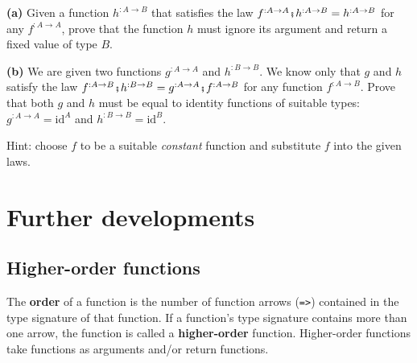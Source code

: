 \textbf{(a)} Given a function $h^{:A\rightarrow B}$ that satisfies
the law $f^{:A\rightarrow A}\bef h^{:A\rightarrow B}=h^{:A\rightarrow B}$
for any $f^{:A\rightarrow A}$, prove that the function $h$ must
ignore its argument and return a fixed value of type $B$.

\textbf{(b)} We are given two functions $g^{:A\rightarrow A}$ and
$h^{:B\rightarrow B}$. We know only that $g$ and $h$ satisfy the
law $f^{:A\rightarrow B}\bef h^{:B\rightarrow B}=g^{:A\rightarrow A}\bef f^{:A\rightarrow B}$
for any function $f^{:A\rightarrow B}$. Prove that both $g$ and
$h$ must be equal to identity functions of suitable types: $g^{:A\rightarrow A}=\text{id}^{A}$
and $h^{:B\rightarrow B}=\text{id}^{B}$.

Hint: choose $f$ to be a suitable \emph{constant} function and substitute
$f$ into the given laws.%
\begin{comment}
Solution:

\textbf{(a)} Choose $f^{:A\rightarrow A}\triangleq\_\rightarrow a$
and compute $x\triangleright f\bef h=h(a)\overset{!}{=}x\triangleright h$.
So, $h(x)$ equals a fixed value $h(a)$. It then follows that the
value $h(a)$ does not depend on $a$ either; so $h(x)$ is a constant
that must be hard-coded in $h$. 

\textbf{(b)} Choose $f^{:A\rightarrow B}\triangleq\_\rightarrow b$
and compute $x\triangleright f\bef h=h(b)\overset{!}{=}x\triangleright g\bef f=x\triangleright g\triangleright f=b$.
It follows that $h(b)=b$ for any $b$, so $h$ is an identity function.
Substitute that into the law and get $f=g\bef f$ for any function
$f$. Substitute the $f\triangleq\text{id}$ into that and derive
$\text{id}=g\bef\text{id}=g$.
\end{comment}


\section{Further developments}

\subsection{Higher-order functions}

The \textbf{order} of a function is the
number of function arrows (\lstinline!=>!) contained in the type
signature of that function. If a function\textsf{'}s type signature contains
more than one arrow, the function is called a \textbf{higher-order}
function. Higher-order functions take functions as arguments and/or
return functions.

